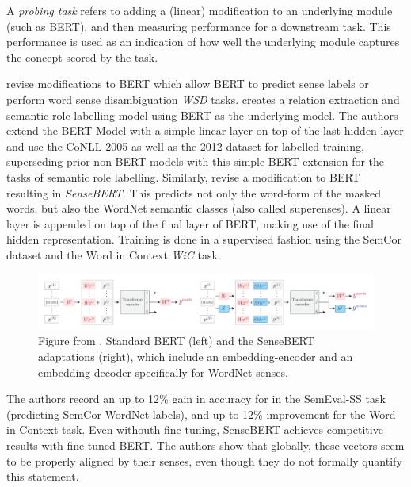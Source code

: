 \documentclass[a4paper,12pt,oneside,openright]{report}
\begin{document}
A \textit{probing task} refers to adding a (linear) modification to an underlying module (such as BERT), and then measuring performance for a downstream task.
This performance is used as an indication of how well the underlying module captures the concept scored by the task.

\cite{shi19, levine19, wiedmann19} revise modifications to BERT which allow BERT to predict sense labels or perform word sense disambiguation \textit{WSD} tasks. 
\cite{shi19} creates a relation extraction and semantic role labelling model using BERT as the underlying model.
The authors extend the BERT Model with a simple linear layer on top of the last hidden layer and use the CoNLL 2005 \cite{carreras04} as well as the 2012  dataset \cite{pradhan13} for labelled training, superseding prior non-BERT models with this simple BERT extension for the tasks of semantic role labelling. 
Similarly, \cite{levine19} revise a modification to BERT resulting in \textit{SenseBERT}.
This predicts not only the word-form of the masked words, but also the WordNet semantic classes (also called superenses).
A linear layer is appended on top of the final layer of BERT, making use of the final hidden representation.
Training is done in a supervised fashion using the SemCor dataset and the Word in Context \textit{WiC} task.

\begin{figure}
	\center
  \includegraphics[width=\linewidth]{./assets/relatedwork/sensebert.png}
  \caption{Figure from \cite{levine19}. Standard BERT (left) and the SenseBERT adaptations (right), which include an embedding-encoder and an embedding-decoder specifically for WordNet senses.}
  \label{fig:embeddings_by_language}
\end{figure}

The authors record an up to 12\% gain in accuracy for in the SemEval-SS task (predicting SemCor WordNet labels), and up to 12\% improvement for the Word in Context task.
Even withouth fine-tuning, SenseBERT achieves competitive results with fine-tuned BERT.
The authors show that globally, these vectors seem to be properly aligned by their senses, even though they do not formally quantify this statement. \\
\end{document}
